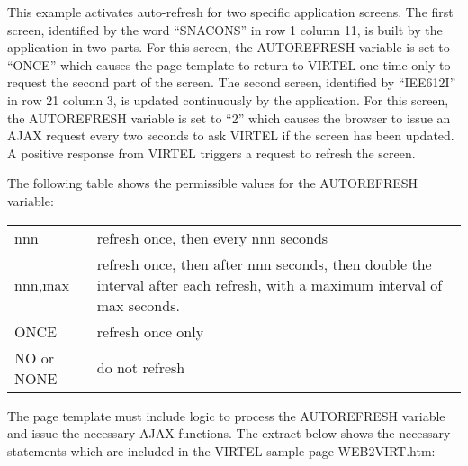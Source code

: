 \documentclass[letterpaper,10pt,english]{sphinxmanual}
\begin{document}

This example activates auto-refresh for two specific application screens. The first screen, identified by the word
“SNACONS” in row 1 column 11, is built by the application in two parts. For this screen, the AUTOREFRESH variable is
set to “ONCE” which causes the page template to return to VIRTEL one time only to request the second part of the
screen. The second screen, identified by “IEE612I” in row 21 column 3, is updated continuously by the application. For
this screen, the AUTOREFRESH variable is set to “2” which causes the browser to issue an AJAX request every two
seconds to ask VIRTEL if the screen has been updated. A positive response from VIRTEL triggers a request to refresh
the screen.

The following table shows the permissible values for the AUTOREFRESH variable:


\begin{savenotes}\sphinxattablestart
\centering
\begin{tabulary}{\linewidth}[t]{|T|T|}
\hline
{}\relax &\relax \\
\hline
nnn
&
refresh once, then every nnn seconds
\\
\hline
nnn,max
&
refresh once, then after nnn seconds, then double the
interval after each refresh, with a maximum interval of
max seconds.
\\
\hline
ONCE
&
refresh once only
\\
\hline
NO or NONE
&
do not refresh
\\
\hline
\end{tabulary}
\par
\sphinxattableend\end{savenotes}


The page template must include logic to process the AUTOREFRESH variable and issue the necessary AJAX functions.
The extract below shows the necessary statements which are included in the VIRTEL sample page WEB2VIRT.htm:
\end{document}
